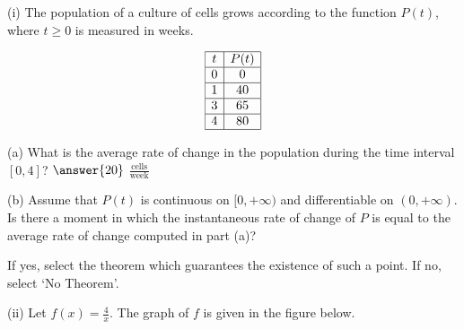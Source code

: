 \documentclass{ximera}
\begin{document}
\begin{exercise}
(i) The population of a culture of cells grows according to the function $P(t)$, where $t\geq 0$ is measured in weeks.

\[
\begin{array}{|c|c|}\hline
t & P(t) \\ \hline
0 & 0 \\ \hline
1 & 40 \\ \hline
3 & 65 \\ \hline
4 & 80 \\ \hline
\end{array}
\]

(a) What is the average rate of change in the population during the time interval $[0,4]$? $\answer{20}$ $\frac{\text{cells}}{\text{week}}$

(b) Assume that $P(t)$ is continuous on $[0,+\infty)$ and differentiable on $(0,+\infty)$. Is there a moment in which the instantaneous rate of change of $P$ is equal to the average rate of change computed in part (a)? \begin{multipleChoice}\end{multipleChoice}

If yes, select the theorem which guarantees the existence of such a point. If no, select `No Theorem'. \begin{multipleChoice}\end{multipleChoice}

(ii) Let $f(x)=\frac{4}{x}$. The graph of $f$ is given in the figure below.

\begin{image}
\end{image}


\end{exercise}
\end{document}
